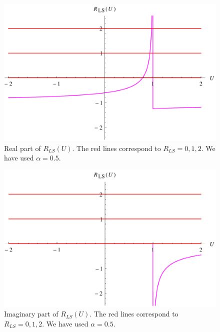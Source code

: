 \begin{figure}
\centering
\includegraphics[scale=0.6]{Plots/ReLS2.pdf}
\caption[Real part of the Lee-Sawyer Regge trajectory function for massless $\phi^{3}$ theory]{Real part of $R_{LS}(U)$. The red lines correspond to $R_{LS} = 0, 1, 2$. We have used $\alpha = 0.5$.}
\label{ReLSFig}
\end{figure}

\begin{figure}
\centering
\includegraphics[scale=0.6]{Plots/ImLS2.pdf}
\caption[Imaginary part of the Lee-Sawyer Regge trajectory function for massless $\phi^{3}$ theory]{Imaginary part of $R_{LS}(U)$. The red lines correspond to $R_{LS} = 0, 1, 2$. We have used $\alpha = 0.5$.}
\label{ImLSFig}
\end{figure}


